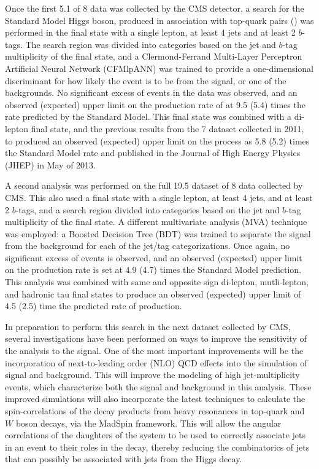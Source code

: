 \par Once the first 5.1 \fbinv of 8 \TeV data was collected by the CMS
detector, a search for the Standard Model Higgs boson, produced in
association with top-quark pairs (\ttH) was performed in the final
state with a single lepton, at least 4 jets and at least 2 $b$-tags.
The search region was divided into categories based on the jet and
$b$-tag multiplicity of the final state, and a Clermond-Ferrand
Multi-Layer Perceptron Artificial Neural Network (CFMlpANN) was
trained to provide a one-dimensional discriminant for how likely the
event is to be from the \ttH signal, or one of the \ttjets
backgrounds.  No significant excess of events in the data was
observed, and an observed (expected) upper limit on the production
rate of \ttH at 9.5 (5.4) times the rate predicted by the Standard
Model.  This final state was combined with a di-lepton final state,
and the previous results from the 7 \TeV dataset collected in 2011, to
produced an observed (expected) upper limit on the \ttH process as 5.8
(5.2) times the Standard Model rate and published in the Journal of
High Energy Physics (JHEP) in May of 2013.  

\par A second analysis was performed on the full 19.5 \fbinv dataset of
8 \TeV data collected by CMS.  This also used a final state with a
single lepton, at least 4 jets, and at least 2 $b$-tags, and a search
region divided into categories based on the jet and $b$-tag
multiplicity of the final state.  A different multivariate analysis
(MVA) technique was employed: a Boosted Decision Tree (BDT) was
trained to separate the \ttH signal from the \ttjets background for
each of the jet/tag categorizations.  Once again, no significant
excess of events is observed, and an observed (expected) upper limit
on the \ttH production rate is set at 4.9 (4.7) times the Standard
Model prediction.  This analysis was combined with same and opposite
sign di-lepton, mutli-lepton, and hadronic tau final states to produce
an observed (expected) upper limit of 4.5 (2.5) time the predicted rate
of \ttH production.  

\par In preparation to perform this search in the next dataset
collected by CMS, several investigations have been performed on ways
to improve the sensitivity of the analysis to the \ttH signal.  One of
the most important improvements will be the incorporation of
next-to-leading order (NLO) QCD effects into the simulation of \ttH
signal and \ttjets background.  This will improve the modeling of high
jet-multiplicity events, which characterize both the signal and
background in this analysis.  These improved simulations will also
incorporate the latest techniques to calculate the spin-correlations
of the decay products from heavy resonances in top-quark and $W$ boson
decays, via the MadSpin framework.  This will allow the angular
correlations of the daughters of the \ttbar system to be used to
correctly associate jets in an event to their roles in the \ttbar
decay, thereby reducing the combinatorics of jets that can possibly be
associated with jets from the Higgs decay.  


